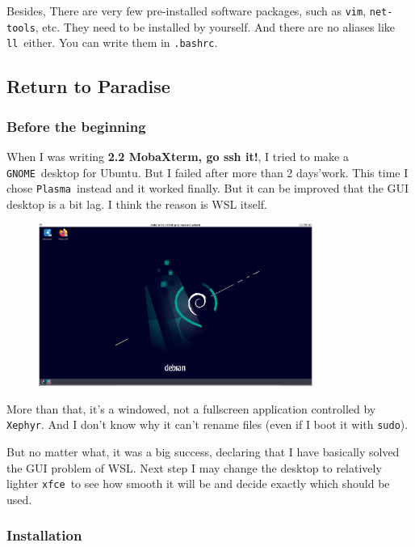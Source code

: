 \documentclass[12pt]{ctexart}
\begin{document}
\fontsize{12}{14}

Besides, There are very few pre-installed software packages, such as
\texttt{vim}, \texttt{net-tools}, etc. They need to be installed by
yourself. And there are no aliases like \texttt{ll}\ either. You can
write them in \texttt{.bashrc}.

\newpage
\subsection{\textbf{Return to Paradise}}

\subsubsection{\textbf{Before the beginning}}

When I was writing \textbf{2.2 MobaXterm, go ssh it!}, I tried to make a
\texttt{GNOME}\ desktop for Ubuntu. But I failed after more than 2
days'work. This time I chose \texttt{Plasma}\ instead
and it worked finally. But it can be improved that the GUI desktop is a
bit lag. I think the reason is WSL itself.

\begin{figure}[H]
    \centering
    \includegraphics[width=0.8\textwidth,keepaspectratio]{assets/Linux/2.8 Return to Paradise/1.png}
\end{figure}

More than that, it's a windowed, not a fullscreen
application controlled by \texttt{Xephyr}. And I don't
know why it can't rename files (even if I boot it with
\texttt{sudo}).

But no matter what, it was a big success, declaring that I have
basically solved the GUI problem of WSL. Next step I may change the
desktop to relatively lighter \texttt{xfce}\ to see how smooth it will be
and decide exactly which should be used.

\subsubsection{\textbf{Installation}}
\end{document}
